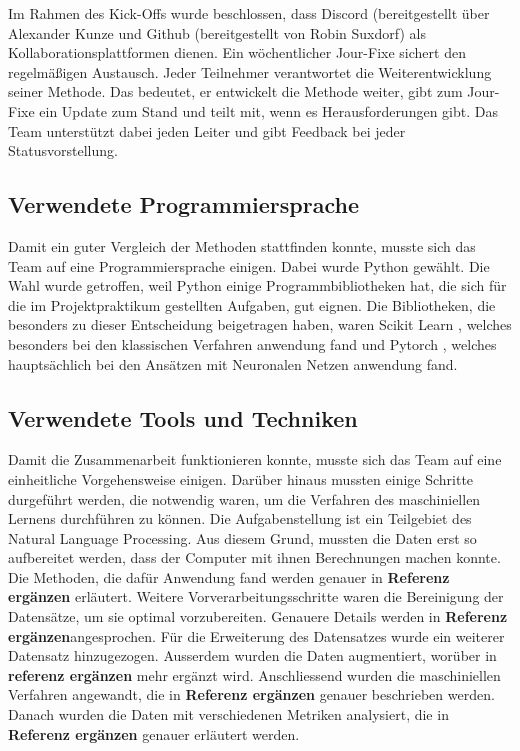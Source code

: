 Im Rahmen des Kick-Offs wurde beschlossen, dass Discord (bereitgestellt über Alexander Kunze und Github (bereitgestellt von Robin Suxdorf) als Kollaborationsplattformen dienen. Ein wöchentlicher Jour-Fixe sichert den regelmäßigen Austausch. Jeder Teilnehmer verantwortet die Weiterentwicklung seiner Methode. Das bedeutet, er entwickelt die Methode weiter, gibt zum Jour-Fixe ein Update zum Stand und teilt mit, wenn es Herausforderungen gibt. Das Team unterstützt dabei jeden Leiter und gibt Feedback bei jeder Statusvorstellung.


\subsection{Verwendete Programmiersprache}
Damit ein guter Vergleich der Methoden stattfinden konnte, musste sich das Team auf eine Programmiersprache einigen. Dabei wurde Python gewählt. Die Wahl wurde getroffen, weil Python einige Programmbibliotheken hat, die sich für die im Projektpraktikum gestellten Aufgaben, gut eignen. Die Bibliotheken, die besonders zu dieser Entscheidung beigetragen haben, waren Scikit Learn \cite{skicitLearnRef}, welches besonders bei den klassischen Verfahren anwendung fand und Pytorch \cite{pytorchRef}, welches hauptsächlich bei den Ansätzen mit Neuronalen Netzen anwendung fand.

\subsection{Verwendete Tools und Techniken}
Damit die Zusammenarbeit funktionieren konnte, musste sich das Team auf eine einheitliche Vorgehensweise einigen. Darüber hinaus mussten einige Schritte durgeführt werden, die notwendig waren, um die Verfahren des maschiniellen Lernens durchführen zu können. Die Aufgabenstellung ist ein Teilgebiet des Natural Language Processing. Aus diesem Grund, mussten die Daten erst so aufbereitet werden, dass der Computer mit ihnen Berechnungen machen konnte. Die Methoden, die dafür Anwendung fand werden genauer in \textbf{Referenz ergänzen} erläutert. Weitere Vorverarbeitungsschritte waren die Bereinigung der Datensätze, um sie optimal vorzubereiten. Genauere Details werden in \textbf{Referenz ergänzen}angesprochen. Für die Erweiterung des Datensatzes wurde ein weiterer Datensatz hinzugezogen. Ausserdem wurden die Daten augmentiert, worüber in \textbf{referenz ergänzen} mehr ergänzt wird. Anschliessend wurden die maschiniellen Verfahren angewandt, die in \textbf{Referenz ergänzen} genauer beschrieben werden. Danach wurden die Daten mit verschiedenen Metriken analysiert, die in \textbf{Referenz ergänzen} genauer erläutert werden.